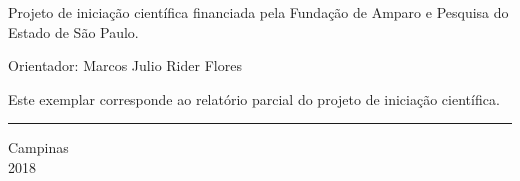     
\vspace*{1.0cm}
    
\begin{flushright}
\begin{minipage}{11.0cm}
Projeto de iniciação científica financiada pela Fundação de Amparo e Pesquisa do Estado de São Paulo. 
    
\vspace*{0.5cm}
    
\vspace*{1.0cm}
Orientador: Marcos Julio Rider Flores
    
\end{minipage}
\end{flushright}
    
\null \vfill
\begin{minipage}{7cm}
\small
Este exemplar corresponde ao relatório parcial do projeto de iniciação científica.    
\rule{6.9cm}{0.2mm} \hfill 
\end{minipage}
    
\null \vfill
\begin{center}
    Campinas\\2018
\end{center}
\thispagestyle{empty}
\newpage